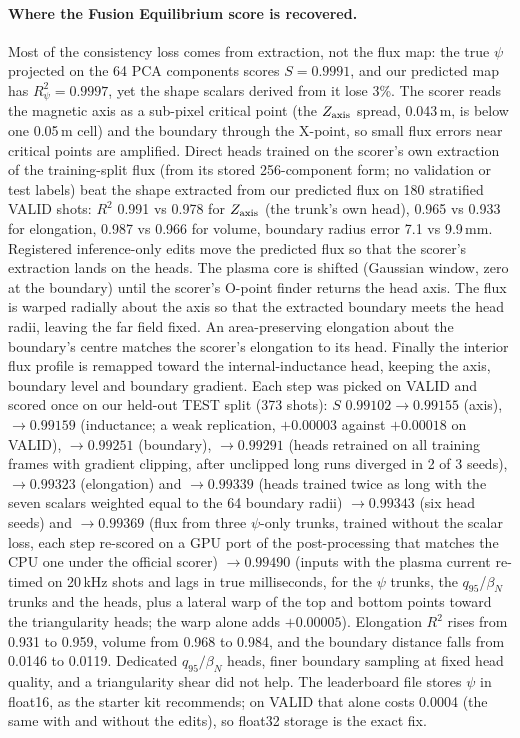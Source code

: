\documentclass{article}
\begin{document}
\paragraph{Where the Fusion Equilibrium score is recovered.} Most of the consistency loss comes from extraction, not the flux map: the true $\psi$ projected on the 64 PCA components scores $S=0.9991$, and our predicted map has $R^2_\psi=0.9997$, yet the shape scalars derived from it lose 3\%. The scorer reads the magnetic axis as a sub-pixel critical point (the $Z_{\rm axis}$ spread, 0.043\,m, is below one 0.05\,m cell) and the boundary through the X-point, so small flux errors near critical points are amplified. Direct heads trained on the scorer's own extraction of the training-split flux (from its stored 256-component form; no validation or test labels) beat the shape extracted from our predicted flux on 180 stratified VALID shots: $R^2$ 0.991 vs 0.978 for $Z_{\rm axis}$ (the trunk's own head), 0.965 vs 0.933 for elongation, 0.987 vs 0.966 for volume, boundary radius error 7.1 vs 9.9\,mm. Registered inference-only edits move the predicted flux so that the scorer's extraction lands on the heads. The plasma core is shifted (Gaussian window, zero at the boundary) until the scorer's O-point finder returns the head axis. The flux is warped radially about the axis so that the extracted boundary meets the head radii, leaving the far field fixed. An area-preserving elongation about the boundary's centre matches the scorer's elongation to its head. Finally the interior flux profile is remapped toward the internal-inductance head, keeping the axis, boundary level and boundary gradient. Each step was picked on VALID and scored once on our held-out TEST split (373 shots): $S$ $0.99102\to0.99155$ (axis), $\to0.99159$ (inductance; a weak replication, $+0.00003$ against $+0.00018$ on VALID), $\to0.99251$ (boundary), $\to0.99291$ (heads retrained on all training frames with gradient clipping, after unclipped long runs diverged in 2 of 3 seeds), $\to0.99323$ (elongation) and $\to0.99339$ (heads trained twice as long with the seven scalars weighted equal to the 64 boundary radii) $\to0.99343$ (six head seeds) and $\to0.99369$ (flux from three $\psi$-only trunks, trained without the scalar loss, each step re-scored on a GPU port of the post-processing that matches the CPU one under the official scorer) $\to0.99490$ (inputs with the plasma current re-timed on 20\,kHz shots and lags in true milliseconds, for the $\psi$ trunks, the $q_{95}$/$\beta_N$ trunks and the heads, plus a lateral warp of the top and bottom points toward the triangularity heads; the warp alone adds $+0.00005$). Elongation $R^2$ rises from 0.931 to 0.959, volume from 0.968 to 0.984, and the boundary distance falls from 0.0146 to 0.0119. Dedicated $q_{95}/\beta_N$ heads, finer boundary sampling at fixed head quality, and a triangularity shear did not help. The leaderboard file stores $\psi$ in float16, as the starter kit recommends; on VALID that alone costs 0.0004 (the same with and without the edits), so float32 storage is the exact fix.
\end{document}
